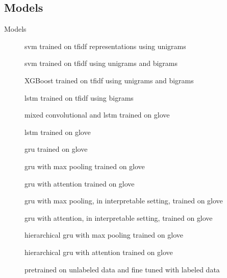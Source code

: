 \subsection{Models}
\begin{frame}{Models}
  \small
  \begin{description}
  \item[\svm] \alert{\acs{svm}} trained on \alert{\acs{tfidf}} representations using \alert{unigrams}
  \item[\svmb] \alert{\acs{svm}} trained on \alert{\acs{tfidf}} using
    \alert{unigrams} and \alert{bigrams}
  \item[\xgb] \alert{XGBoost} trained on \alert{\acs{tfidf}} using
    \alert{unigrams} and \alert{bigrams}
  \item[\lstmng] \alert{\acs{lstm}} trained on \alert{\acs{tfidf}} using
    \alert{bigrams}
  \item[\lstmc] mixed \alert{convolutional} and \alert{\ac{lstm}} trained on
    \alert{\acs{glove}}
  \item[\lstmb] \alert{\acs{lstm}} trained on \alert{\acs{glove}}
  \item[\gru] \alert{\acs{gru}} trained on \alert{\acs{glove}}
  \item[\maxp] \alert{\acs{gru}} with \alert{max} pooling trained on \alert{\acs{glove}}
  \item[\softmax] \alert{\acs{gru}} with \alert{attention} trained on \alert{\acs{glove}}
  \item[\maxi] \alert{\acs{gru}} with \alert{max} pooling, in \alert{interpretable} setting, trained on \alert{\acs{glove}}
  \item[\softmaxi] \alert{\acs{gru}} with \alert{attention}, in \alert{interpretable} setting, trained on \alert{\acs{glove}}
  \item[\maxh] \alert{hierarchical \acs{gru}} with \alert{max} pooling trained on \alert{\acs{glove}}
  \item[\softmaxh] \alert{hierarchical \acs{gru}} with \alert{attention} trained on \alert{\acs{glove}}
  \item[\bert] \alert{pretrained} on unlabeled data and \alert{fine tuned} with labeled data
  \end{description}
\end{frame}

